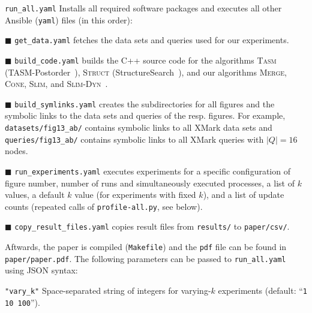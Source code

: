 \documentclass[a4, 10pt]{article}
\newenvironment{packed_descr}{
\begin{description}
  \setlength{\itemsep}{1pt}
  \setlength{\parskip}{0pt}
  \setlength{\parsep}{0pt}
}{\end{description}}
\begin{document}
\begin{packed_descr}
  \item[\texttt{run\_all.yaml}] Installs all required software packages and executes all other Ansible (\texttt{yaml}) files (in this order):
    \begin{packed_descr}
      \item[\quad $\blacksquare$ \texttt{get\_data.yaml}] fetches the data sets and queries used for our experiments.
      \item[\quad $\blacksquare$ \texttt{build\_code.yaml}] builds the C++ source code for the algorithms \textsc{Tasm} (TASM-Postorder~\cite{augsten-icde-2010}), \textsc{Struct} (StructureSearch~\cite{cohen-sigmod-2013}), and our algorithms \textsc{Merge}, \textsc{Cone}, \textsc{Slim}, and \textsc{Slim-Dyn}~\cite{kocher-sigmod-2019}.
      \item[\quad $\blacksquare$ \texttt{build\_symlinks.yaml}] creates the subdirectories for all figures and the symbolic links to the data sets and queries of the resp. figures. For example, \texttt{datasets/fig13\_ab/} contains symbolic links to all XMark data sets and \texttt{queries/fig13\_ab/} contains symbolic links to all XMark queries with $|Q| = 16$ nodes.
      \item[\quad $\blacksquare$ \texttt{run\_experiments.yaml}] executes experiments for a specific configuration of figure number, number of runs and simultaneously executed processes, a list of $k$ values, a default $k$ value (for experiments with fixed $k$), and a list of update counts (repeated calls of \texttt{profile-all.py}, see below).
      \item[\quad $\blacksquare$ \texttt{copy\_result\_files.yaml}] copies result files from \texttt{results/} to \texttt{paper/csv/}.
    \end{packed_descr}
  Aftwards, the paper is compiled (\texttt{Makefile}) and the \texttt{pdf} file can be found in \texttt{paper/paper.pdf}.
  \clearpage%
  The following parameters can be passed to \texttt{run\_all.yaml} using JSON syntax:
  \begin{packed_descr}
    \item[\texttt{"vary\_k"}] Space-separated string of integers for varying-$k$ experiments (default: ``\texttt{1 10 100}''). 

\end{packed_descr}
\end{packed_descr}
\end{document}
